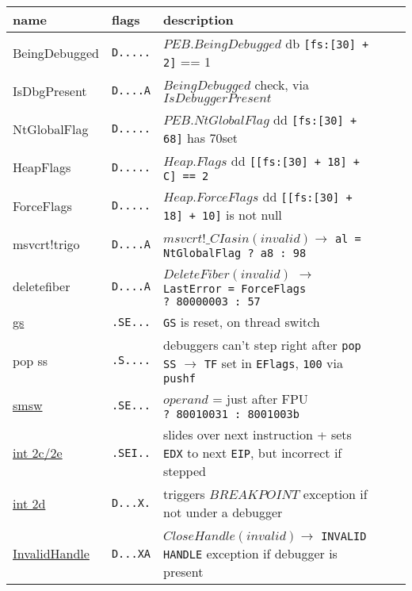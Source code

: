 \begin{tabular}{lllll}
\toprule
name 			&  flags & description \\
\midrule
BeingDebugged		& {\tt D.....} & $ PEB.BeingDebugged $ db {\tt [fs:[30] + 2]} == 1\\
IsDbgPresent		& {\tt D....A} & $BeingDebugged$ check, via $IsDebuggerPresent$ \\
NtGlobalFlag			& {\tt D.....} & $ PEB.NtGlobalFlag $ dd {\tt [fs:[30] + 68]} has 70\footnotemark set \\
HeapFlags			& {\tt D.....} & $Heap.Flags$ dd {\tt [[fs:[30] + 18] + C] == 2} \\
ForceFlags			& {\tt D.....} & $Heap.ForceFlags$ dd {\tt  [[fs:[30] + 18] + 10]} is not null \\
msvcrt!trigo			& {\tt D....A} & $msvcrt!\_CIasin(invalid) \rightarrow$ {\tt al = NtGlobalFlag ?\ a8 :\ 98} \\
deletefiber			& {\tt D....A} & $DeleteFiber(invalid)$ $\rightarrow$ {\tt LastError = ForceFlags ?\ 80000003 :\ 57}\\
\href{http://corkami.blogspot.com/2010/01/hen-never-laid-and-corn-never-growed.html}
{gs} 				& {\tt .SE...} & {\tt GS} is reset, on thread switch \\
pop ss			& {\tt .S....} & debuggers can't step right after {\tt pop SS} $\rightarrow$ {\tt TF} set in {\tt EFlags}, {\tt 100} via {\tt pushf} \\
\href{http://corkami.blogspot.com/2010/01/policeman-got-no-gun-u-dont-have-2-run.html}
{smsw} 			& {\tt .SE...} & $operand$ = just after FPU {\tt ?\ 80010031 :\ 8001003b} \\
\href{http://corkami.blogspot.com/2010/03/si-cest-ton-corps-qui-bouge-cest-ton.html}
{int 2c/2e} 			& {\tt .SEI..} & slides over next instruction + sets {\tt EDX} to next {\tt EIP}, but incorrect if stepped\\
\href{http://corkami.blogspot.com/2010/02/and-when-i-start-to-come-undone-stitch.html}
{int 2d}			& {\tt D...X.} & triggers $BREAKPOINT$ exception if not under a debugger\\
\href{http://corkami.blogspot.com/2010/02/and-when-i-start-to-come-undone-stitch.html}
{InvalidHandle}		& {\tt D...XA} & $CloseHandle(invalid) \rightarrow$ {\tt INVALID HANDLE} exception if debugger is present\\

\end{tabular}
